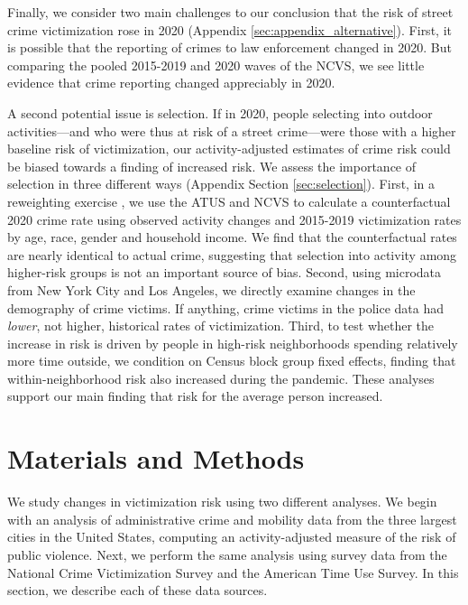 \documentclass[12pt]{article}
\begin{document}

Finally, we consider two main challenges to our conclusion that the risk of street crime victimization rose in 2020 (Appendix \ref{sec:appendix_alternative}). First, it is possible that the reporting of crimes to law enforcement changed in 2020. But comparing the pooled 2015-2019 and 2020 waves of the NCVS, we see little evidence that crime reporting changed appreciably in 2020. 

A second potential issue is selection. If in 2020, people selecting into outdoor activities---and who were thus at risk of a street crime---were those with a higher baseline risk of victimization, our activity-adjusted estimates of crime risk could be biased towards a finding of increased risk. We assess the importance of selection in three different ways (Appendix Section \ref{sec:selection}). First, in a reweighting exercise \citep{dinardo1996labor}, we use the ATUS and NCVS to calculate a counterfactual 2020 crime rate using observed activity changes and 2015-2019 victimization rates by age, race, gender and household income. We find that the counterfactual rates are nearly identical to actual crime, suggesting that selection into activity among higher-risk groups is not an important source of bias. Second, using microdata from New York City and Los Angeles, we directly examine changes in the demography of crime victims. If anything, crime victims in the police data had \textit{lower}, not higher, historical rates of victimization. Third, to test whether the increase in risk is driven by people in high-risk neighborhoods spending relatively more time outside, we condition on Census block group fixed effects, finding that within-neighborhood risk also increased during the pandemic. These analyses support our main finding that risk for the average person increased.

\section{Materials and Methods}
We study changes in victimization risk using two different analyses. We begin with an analysis of administrative crime and mobility data from the three largest cities in the United States, computing an activity-adjusted measure of the risk of public violence. Next, we perform the same analysis using survey data from the National Crime Victimization Survey and the American Time Use Survey. In this section, we describe each of these data sources.
\end{document}
